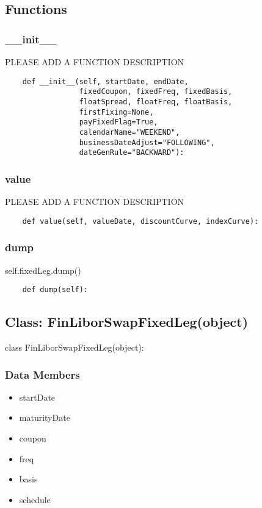 \documentclass[twoside,11pt]{book}
\begin{document}
\subsection*{Functions}

\subsubsection*{{\bf \_\_init\_\_}}
PLEASE ADD A FUNCTION DESCRIPTION

\begin{lstlisting}
    def __init__(self, startDate, endDate,
                 fixedCoupon, fixedFreq, fixedBasis,
                 floatSpread, floatFreq, floatBasis,
                 firstFixing=None,
                 payFixedFlag=True,
                 calendarName="WEEKEND",
                 businessDateAdjust="FOLLOWING",
                 dateGenRule="BACKWARD"):
\end{lstlisting}

\subsubsection*{{\bf value}}
PLEASE ADD A FUNCTION DESCRIPTION

\begin{lstlisting}
    def value(self, valueDate, discountCurve, indexCurve):
\end{lstlisting}

\subsubsection*{{\bf dump}}
self.fixedLeg.dump() 

\begin{lstlisting}
    def dump(self):
\end{lstlisting}

\subsection*{Class: FinLiborSwapFixedLeg(object)}
class FinLiborSwapFixedLeg(object): 

\subsubsection*{Data Members}
\begin{itemize}
\item{startDate}
\item{maturityDate}
\item{coupon}
\item{freq}
\item{basis}
\item{schedule}
\end{itemize}
\end{document}
